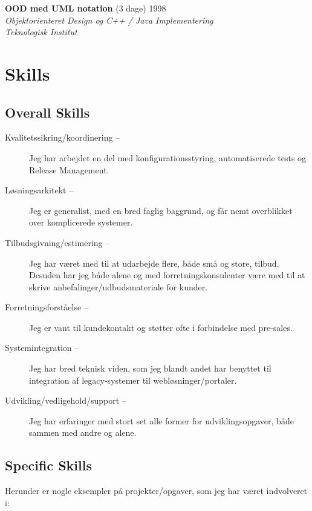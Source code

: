 \documentclass[a4paper,11pt]{article}
\begin{document}
\textbf{OOD med UML notation} \hfill (3 dage) 1998 \\
\textsl{Objektorienteret Design og C++ / Java Implementering\\Teknologisk Institut}


\section*{Skills}

\subsection*{Overall Skills}

\begin{description}

  \item[Kvalitetssikring/koordinering --] Jeg har arbejdet en del
    med konfigurationsstyring, automatiserede tests og Release
    Management.

  \item[Løsningsarkitekt --] Jeg er generalist, med en bred faglig
    baggrund, og får nemt overblikket over komplicerede systemer.

  \item[Tilbudsgivning/estimering --] Jeg har været med til at
    udarbejde flere, både små og store, tilbud. Desuden har jeg både
    alene og med forretningskonsulenter være med til at skrive
    anbefalinger/udbudsmateriale for kunder.

  \item[Forretningsforståelse --] Jeg er vant til kundekontakt og
    støtter ofte i forbindelse med pre-sales.

  \item[Systemintegration --] Jeg har bred teknisk viden, som jeg
    blandt andet har benyttet til integration af legacy-systemer til
    webløsninger/portaler.

  \item[Udvikling/vedligehold/support --] Jeg har erfaringer med
    stort set alle former for udviklingsopgaver, både sammen med
    andre og alene.

\end{description}

\subsection*{Specific Skills}

Herunder er nogle eksempler på projekter/opgaver, som jeg har været
indvolveret i:
\end{document}
